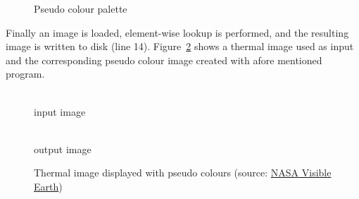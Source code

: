 \documentclass[12pt,a4paper,oneside,openright]{book}
\newcommand{\fig}[1]{Figure~\ref{fig:#1}}
\begin{document}
\begin{CJK}{UTF8}{}
\begin{figure}[htbp]
\begin{center}
    \caption{Pseudo colour palette\label{fig:palette}}
  \end{center}
\end{figure}
Finally an image is loaded, element-wise lookup is performed, and the resulting image is written to disk (line 14). \fig{thermal} shows a thermal image used as input and the corresponding pseudo colour image created with afore mentioned program.
\begin{figure}[htbp]
  \begin{center}
    \begin{minipage}[t]{.45\textwidth}
      \begin{center}
        \\
        input image
      \end{center}
    \end{minipage}
    \hspace{.5cm}
    \begin{minipage}[t]{.45\textwidth}
      \begin{center}
        \\
        output image
      \end{center}
    \end{minipage}
    \caption{Thermal image displayed with pseudo colours (source: \href{http://visibleearth.nasa.gov/view_rec.php?id=1564}{NASA Visible Earth})\label{fig:thermal}}
  \end{center}
\end{figure}


\end{CJK}
\end{document}

